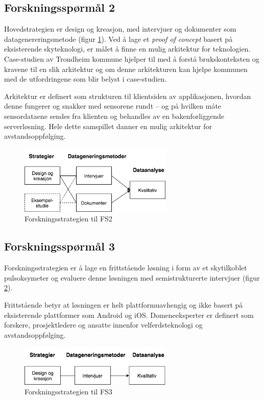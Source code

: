 \subsection{Forskningsspørmål 2}
\textbf{}

Hovedstrategien er design og kreasjon, med intervjuer og dokumenter som datagenereringsmetode (figur \ref{fig:oates_fs2}). Ved å lage
et \textit{proof of concept} basert på eksisterende skyteknologi, er målet å finne en mulig arkitektur for teknologien. Case-studien av Trondheim
kommune hjelper til med å forstå brukskonteksten og kravene til en slik arkitektur og om denne arkitekturen kan hjelpe kommunen med de
utfordringene som blir belyst i case-studien.

Arkitektur er definert
som strukturen til klientsiden av applikasjonen, hvordan denne fungerer og snakker med sensorene rundt -- og på hvilken måte sensordataene sendes
fra klienten og behandles av en bakenforliggende serverløsning. Hele dette samspillet danner en mulig arkitektur for avstandsoppfølging.

\begin{figure}
\centering
\includegraphics[width=0.65\textwidth]{fig/oates/fs2}
\caption{Forskningsstrategien til FS2}
\label{fig:oates_fs2}
\end{figure}
    
\subsection{Forskningsspørmål 3}
\textbf{}

Forskningsstrategien er å lage en frittstående løsning i form av et skytilkoblet pulsoksymeter og evaluere
denne løsningen med semistrukturerte intervjuer (figur \ref{fig:oates_fs3}).
 
Frittstående betyr at løsningen er helt plattformuavhengig og ikke basert på eksisterende plattformer som Android og iOS.
Domeneeksperter er definert som forskere, prosjektledere og ansatte innenfor velferdsteknologi og avstandsoppfølging.

\begin{figure}
\centering
\includegraphics[width=0.65\textwidth]{fig/oates/fs3}
\caption{Forskningsstrategien til FS3}
\label{fig:oates_fs3}
\end{figure}

